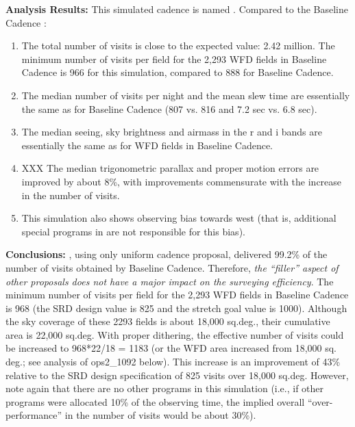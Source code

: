 {\bf Analysis Results:} This simulated cadence is named .
Compared to the Baseline Cadence :
\begin{enumerate}
\item The total number of visits is close to the expected value: 2.42 million.
The minimum number of visits per field for the 2,293 WFD fields in Baseline Cadence
is 966 for this simulation, compared to 888 for Baseline Cadence.
\item The median number of visits per night and the mean slew time are
essentially the same as for Baseline Cadence (807 vs. 816 and 7.2 sec vs. 6.8 sec).
\item The median seeing, sky brightness and airmass in the r and i bands are
      essentially the same as for WFD fields in Baseline Cadence.
\item XXX The median trigonometric parallax and proper motion errors are improved by
about 8\%, with improvements commensurate with the increase in the number of visits.
\item This simulation also shows observing bias towards west (that is, additional
special programs in  are not responsible for this bias).
\end{enumerate}


{\bf Conclusions:} , using only uniform cadence
proposal, delivered 99.2\% of the number of visits obtained by
Baseline Cadence. Therefore, {\it the ``filler'' aspect of other
proposals does not have a major impact on the surveying efficiency}.
The minimum number of visits per field for the 2,293 WFD fields in
Baseline Cadence is 968 (the SRD design value is 825 and the stretch
goal value is 1000). Although the sky coverage of these 2293 fields is
about 18,000 sq.deg., their cumulative area is 22,000 sq.deg. With
proper dithering, the effective number of visits could be increased to
968*22/18 = 1183 (or the WFD area increased from 18,000 sq. deg.; see
analysis of ops2\_1092 below). This increase is an improvement of 43\%
relative to the SRD design specification of 825 visits over 18,000
sq.deg. However, note again that there are no other programs in this
simulation (i.e., if other programs were allocated 10\% of the
observing time, the implied overall ``over-performance'' in the number
of  visits would be about 30\%).



